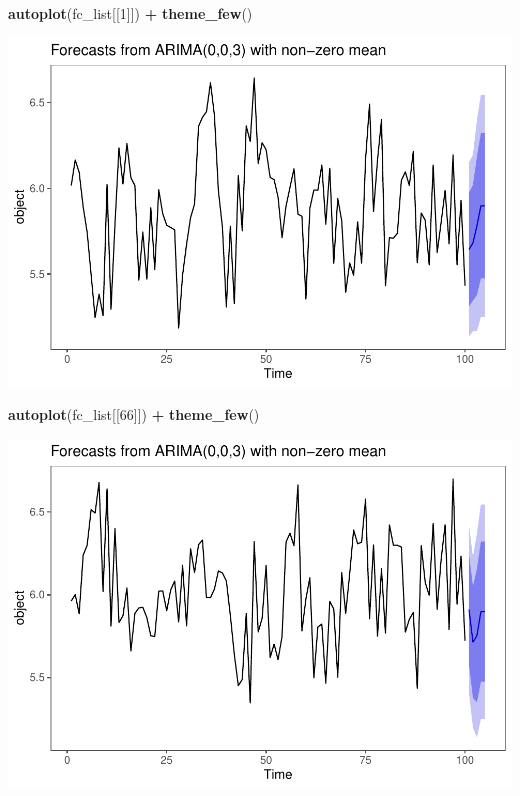\documentclass[]{article}
\newenvironment{Shaded}{\begin{snugshade}}{\end{snugshade}}
\newcommand{\DecValTok}[1]{\textcolor[rgb]{0.00,0.00,0.81}{#1}}
\newcommand{\KeywordTok}[1]{\textcolor[rgb]{0.13,0.29,0.53}{\textbf{#1}}}
\newcommand{\NormalTok}[1]{#1}
\newcommand{\OperatorTok}[1]{\textcolor[rgb]{0.81,0.36,0.00}{\textbf{#1}}}
\newcommand{\StringTok}[1]{\textcolor[rgb]{0.31,0.60,0.02}{#1}}
\begin{document}
\begin{Shaded}
\begin{Highlighting}[]
\KeywordTok{autoplot}\NormalTok{(fc_list[[}\DecValTok{1}\NormalTok{]]) }\OperatorTok{+}\StringTok{ }\KeywordTok{theme_few}\NormalTok{()}
\end{Highlighting}
\end{Shaded}

\includegraphics{Econo2_P4_files/figure-latex/forecast arima plots-2.pdf}

\begin{Shaded}
\begin{Highlighting}[]
\KeywordTok{autoplot}\NormalTok{(fc_list[[}\DecValTok{66}\NormalTok{]]) }\OperatorTok{+}\StringTok{ }\KeywordTok{theme_few}\NormalTok{()}
\end{Highlighting}
\end{Shaded}

\includegraphics{Econo2_P4_files/figure-latex/forecast arima plots-3.pdf}
\end{document}
